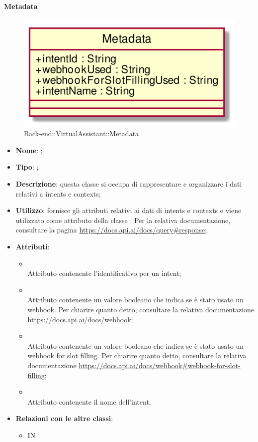 \hypertarget{Metadata_label}{\paragraph{Metadata}}
\begin{figure}[h]
	\centering
	\includegraphics[width=\textwidth,height=\textheight,keepaspectratio]{images/ClassMetadata.png}
	\caption{Back-end::VirtualAssistant::Metadata}
\end{figure}
\begin{itemize}
	\item \textbf{Nome}: ;
	\item \textbf{Tipo}: ;
	\item \textbf{Descrizione}: questa classe si occupa di rappresentare e organizzare i dati relativi a intents e contexts;
	\item \textbf{Utilizzo}: fornisce gli attributi relativi ai dati di intents e contexts e viene utilizzato come attributo della classe .
Per la relativa documentazione, consultare la pagina \url{https://docs.api.ai/docs/query#response};
	\item \textbf{Attributi}:
	\begin{itemize}
		\item[]  \\
		Attributo contenente l'identificativo per un intent;
		\item[]  \\
		Attributo contenente un valore booleano che indica se è stato usato un webhook. Per chiarire quanto detto, consultare la relativa documentazione \url{https://docs.api.ai/docs/webhook};
		\item[]  \\
		Attributo contenente un valore booleano che indica se è stato usato un webhook for slot filling.
Per chiarire quanto detto, consultare la relativa documentazione \url{https://docs.api.ai/docs/webhook#webhook-for-slot-filling};
		\item[]  \\
		Attributo contenente il nome dell'intent;
	\end{itemize}
	\item \textbf{Relazioni con le altre classi}:
	\begin{itemize}
		\item IN \hyperlink{ProcessingResult_label}{}
	\end{itemize}
\end{itemize}
